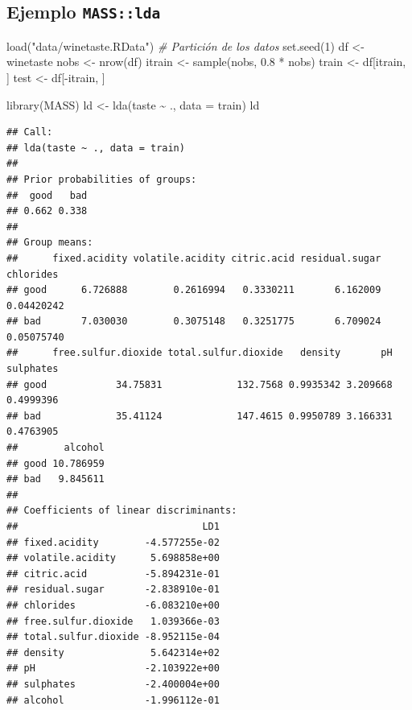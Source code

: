 \documentclass[
]{book}
\newenvironment{Shaded}{\begin{snugshade}}{\end{snugshade}}
\newcommand{\AttributeTok}[1]{\textcolor[rgb]{0.77,0.63,0.00}{#1}}
\newcommand{\CommentTok}[1]{\textcolor[rgb]{0.56,0.35,0.01}{\textit{#1}}}
\newcommand{\DecValTok}[1]{\textcolor[rgb]{0.00,0.00,0.81}{#1}}
\newcommand{\FloatTok}[1]{\textcolor[rgb]{0.00,0.00,0.81}{#1}}
\newcommand{\FunctionTok}[1]{\textcolor[rgb]{0.00,0.00,0.00}{#1}}
\newcommand{\NormalTok}[1]{#1}
\newcommand{\OtherTok}[1]{\textcolor[rgb]{0.56,0.35,0.01}{#1}}
\newcommand{\SpecialCharTok}[1]{\textcolor[rgb]{0.00,0.00,0.00}{#1}}
\newcommand{\StringTok}[1]{\textcolor[rgb]{0.31,0.60,0.02}{#1}}
\theoremstyle{break}
\theoremstyle{definition}
\theoremstyle{definition}
\theoremstyle{definition}
\theoremstyle{definition}
\theoremstyle{remark}
\begin{document}
\hypertarget{ejemplo-masslda}{%
\subsection{\texorpdfstring{Ejemplo \texttt{MASS::lda}}{Ejemplo MASS::lda}}\label{ejemplo-masslda}}

\begin{Shaded}
\begin{Highlighting}[]
\FunctionTok{load}\NormalTok{(}\StringTok{"data/winetaste.RData"}\NormalTok{)}
\CommentTok{\# Partición de los datos}
\FunctionTok{set.seed}\NormalTok{(}\DecValTok{1}\NormalTok{)}
\NormalTok{df }\OtherTok{\textless{}{-}}\NormalTok{ winetaste}
\NormalTok{nobs }\OtherTok{\textless{}{-}} \FunctionTok{nrow}\NormalTok{(df)}
\NormalTok{itrain }\OtherTok{\textless{}{-}} \FunctionTok{sample}\NormalTok{(nobs, }\FloatTok{0.8} \SpecialCharTok{*}\NormalTok{ nobs)}
\NormalTok{train }\OtherTok{\textless{}{-}}\NormalTok{ df[itrain, ]}
\NormalTok{test }\OtherTok{\textless{}{-}}\NormalTok{ df[}\SpecialCharTok{{-}}\NormalTok{itrain, ]}

\FunctionTok{library}\NormalTok{(MASS)}
\NormalTok{ld }\OtherTok{\textless{}{-}} \FunctionTok{lda}\NormalTok{(taste }\SpecialCharTok{\textasciitilde{}}\NormalTok{ ., }\AttributeTok{data =}\NormalTok{ train)}
\NormalTok{ld}
\end{Highlighting}
\end{Shaded}

\begin{verbatim}
## Call:
## lda(taste ~ ., data = train)
## 
## Prior probabilities of groups:
##  good   bad 
## 0.662 0.338 
## 
## Group means:
##      fixed.acidity volatile.acidity citric.acid residual.sugar  chlorides
## good      6.726888        0.2616994   0.3330211       6.162009 0.04420242
## bad       7.030030        0.3075148   0.3251775       6.709024 0.05075740
##      free.sulfur.dioxide total.sulfur.dioxide   density       pH sulphates
## good            34.75831             132.7568 0.9935342 3.209668 0.4999396
## bad             35.41124             147.4615 0.9950789 3.166331 0.4763905
##        alcohol
## good 10.786959
## bad   9.845611
## 
## Coefficients of linear discriminants:
##                                LD1
## fixed.acidity        -4.577255e-02
## volatile.acidity      5.698858e+00
## citric.acid          -5.894231e-01
## residual.sugar       -2.838910e-01
## chlorides            -6.083210e+00
## free.sulfur.dioxide   1.039366e-03
## total.sulfur.dioxide -8.952115e-04
## density               5.642314e+02
## pH                   -2.103922e+00
## sulphates            -2.400004e+00
## alcohol              -1.996112e-01
\end{verbatim}
\end{document}
